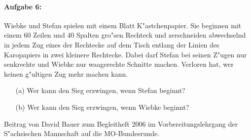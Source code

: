 \documentclass[a4paper,11pt]{article}
\begin{document}
\paragraph*{Aufgabe 6:} 
Wiebke und Stefan spielen mit einem Blatt K"astchenpapier.  Sie beginnen mit
einem 60 Zeilen und 40 Spalten gro"sen Rechteck und zerschneiden abwechselnd
in jedem Zug eines der Rechtecke auf dem Tisch entlang der Linien des
Karopapiers in zwei kleinere Rechtecke. Dabei darf Stefan bei seinen Z"ugen
nur senkrechte und Wiebke nur waagerechte Schnitte machen. Verloren hat, wer
keinen g"ultigen Zug mehr machen kann.
\begin{itemize}
\item[(a)] Wer kann den Sieg erzwingen, wenn Stefan beginnt?
\item[(b)] Wer kann den Sieg erzwingen, wenn Wiebke beginnt?
\end{itemize}

\begin{attribution}
Beitrag von David Bauer zum Begleitheft 2006 im Vorbereitungslehrgang der
S"achsischen Mannschaft auf die MO-Bundesrunde.
\end{attribution}
\end{document}
